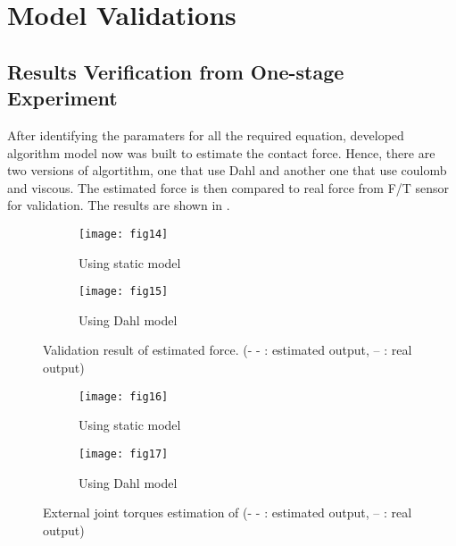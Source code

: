 \chapter{Model Validations}
\label{validation}

\section{Results Verification from One-stage Experiment}

After identifying the paramaters for all the required equation, developed algorithm model now was built to estimate the contact force. Hence, there are two versions of algortithm, one that use Dahl and another one that use coulomb and viscous. The estimated force is then compared to real force from F/T sensor for validation. The results are shown in .

\begin{figure}[H]
  \begin{subfigure}[t]{0.5\textwidth}
    \centering
    \texttt{[image: fig14]} 
    \caption{Using static model}
    \label{fig:static validation}
  \end{subfigure}
  \begin{subfigure}[t]{0.5\textwidth}
    \centering
    \texttt{[image: fig15]}
    \caption{Using Dahl model}
    \label{fig:Dahl validation}
  \end{subfigure}
  \caption{Validation result of estimated force. (- - : estimated output, -- : real output)}
  \label{fig:validation}
\end{figure}

\begin{figure}[H]
  \begin{subfigure}[t]{0.5\textwidth}
    \centering
    \texttt{[image: fig16]} 
    \caption{Using static model}
    \label{fig:static tor}
  \end{subfigure}
  \begin{subfigure}[t]{0.5\textwidth}
    \centering
    \texttt{[image: fig17]}
    \caption{Using Dahl model}
    \label{fig:Dahl tor}
  \end{subfigure}
  \caption{External joint torques estimation of  (- - : estimated output, -- : real output)}
  \label{fig:torque validation}
\end{figure}

